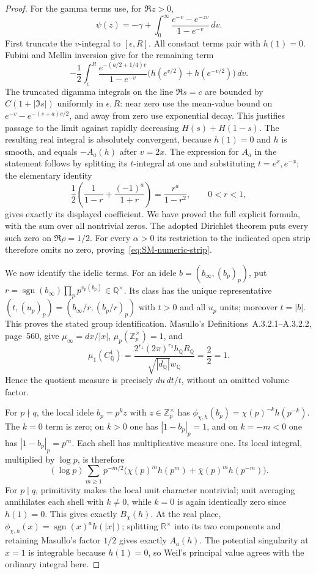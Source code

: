 \begin{proof}
For the gamma terms use, for $\Re z>0$,
\[
 \psi(z)=-\gamma+\int_0^\infty
                 \frac{e^{-v}-e^{-zv}}{1-e^{-v}}\,dv.
\]
First truncate the $v$-integral to $[\epsilon,R]$.  All constant terms
pair with $h(1)=0$.  Fubini and Mellin inversion give for the remaining
term
\[
 -\frac12\int_\epsilon^R
 \frac{e^{-(a/2+1/4)v}}{1-e^{-v}}
       \bigl(h(e^{v/2})+h(e^{-v/2})\bigr)\,dv.
\]
The truncated digamma integrals on the line $\Re s=c$ are bounded by
$C(1+|\Im s|)$ uniformly in $\epsilon,R$: near zero use the mean-value
bound on $e^{-v}-e^{-(s+a)v/2}$, and away from zero use exponential
decay.  This justifies passage to the limit against rapidly decreasing
$H(s)+H(1-s)$.  The resulting real integral is absolutely convergent,
because $h(1)=0$ and $h$ is smooth, and equals $-A_a(h)$ after $v=2x$.
The expression for $A_a$ in the statement follows by splitting its
$t$-integral at one and substituting $t=e^x,e^{-x}$; the elementary
identity
\[
 \frac12\left(\frac1{1-r}+\frac{(-1)^a}{1+r}\right)
       =\frac{r^a}{1-r^2},\qquad 0<r<1,
\]
gives exactly its displayed coefficient.  We have proved the full
explicit formula, with the sum over all nontrivial zeros.
The adopted Dirichlet theorem puts every such zero on $\Re\rho=1/2$.
For every $\alpha>0$ its restriction to the indicated open strip therefore
omits no zero, proving~\eqref{eq:SM-numeric-strip}.

We now identify the idelic terms.  For an idele $b=(b_\infty,(b_p)_p)$,
put $r=\operatorname{sgn}(b_\infty)\prod_p p^{v_p(b_p)}\in\mathbb Q^\times$.
Its class has the unique representative
$(t,(u_p)_p)=(b_\infty/r,(b_p/r)_p)$ with $t>0$ and all $u_p$ units;
moreover $t=|b|$.  This proves the stated group identification.
Masullo's Definitions~A.3.2.1--A.3.2.2, page~560, give
$\mu_\infty=dx/|x|$, $\mu_p(\mathbb Z_p^\times)=1$, and
\[
 \mu_1(C_{\mathbb Q}^1)=\frac{2^{r_1}(2\pi)^{r_2}h_{\mathbb Q}R_{\mathbb Q}}
 {\sqrt{|d_{\mathbb Q}|}w_{\mathbb Q}}=\frac{2}{2}=1.
\]
Hence the quotient measure is precisely $du\,dt/t$, without an omitted
volume factor.

For $p\nmid q$, the local idele $b_p=p^kz$ with
$z\in\mathbb Z_p^\times$ has
$\phi_{\chi,h}(b_p)=\chi(p)^{-k}h(p^{-k})$.  The $k=0$ term is zero;
on $k>0$ one has $|1-b_p|_p=1$, and on $k=-m<0$ one has
$|1-b_p|_p=p^m$.  Each shell has multiplicative measure one.  Its local
integral, multiplied by $\log p$, is therefore
\[
 (\log p)\sum_{m\geq1}p^{-m/2}
 \bigl(\chi(p)^m h(p^m)+\overline\chi(p)^m h(p^{-m})\bigr).
\]
For $p\mid q$, primitivity makes the local unit character nontrivial;
unit averaging annihilates each shell with $k\ne0$, while $k=0$ is again
identically zero since $h(1)=0$.  This gives exactly $B_\chi(h)$.
At the real place,
$\phi_{\chi,h}(x)=\operatorname{sgn}(x)^a h(|x|)$; splitting
$\mathbb R^\times$ into its two components and retaining Masullo's
factor $1/2$ gives exactly $A_a(h)$.  The potential singularity at $x=1$
is integrable because $h(1)=0$, so Weil's principal value agrees with the
ordinary integral here.


\end{proof}
